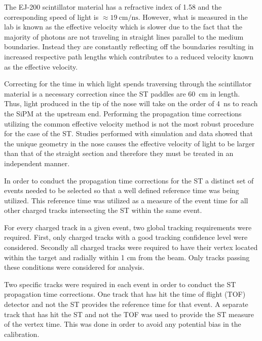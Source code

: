 The EJ-200 scintillator material has a refractive index of 1.58 \cite{ej200_specs} and the corresponding speed of light is $\approx \mathrm{19\ cm/ns}$.  However, what is measured in the lab is known as the effective velocity which is slower due to the fact that the majority of photons are not traveling in straight lines parallel to the medium boundaries.  Instead they are constantly reflecting off the boundaries resulting in increased respective path lengths which contributes to a reduced velocity known as the effective velocity.  

Correcting for the time in which light spends traversing through the scintillator material is a necessary correction since the ST paddles are 60~cm in length.  Thus, light produced in the tip of the nose will take on the order of 4~ns to reach the SiPM at the upstream end.  Performing the propagation time corrections utilizing the common effective velocity method is not the most robust procedure for the case of the ST.  Studies performed with simulation and data showed that the unique geometry in the nose causes the effective velocity of light to be larger than that of the straight section and therefore they must be treated in an independent manner.

In order to conduct the propagation time corrections for the ST a distinct set of events needed to be selected so that a well defined reference time was being utilized.  This reference time was utilized as a measure of the event time for all other charged tracks intersecting the ST within the same event.  

For every charged track in a given event, two global tracking requirements were required.  First, only charged tracks with a good tracking confidence level were considered.  Secondly all charged tracks were required to have their vertex located within the target and radially within 1 cm from the beam. Only tracks passing these conditions were considered for analysis.

Two specific tracks were required in each event in order to conduct the ST propagation time corrections.  One track that has hit the time of flight (TOF) detector and not the ST provides the reference time for that event.  A separate track that has hit the ST and not the TOF was used to provide the ST measure of the vertex time.  This was done in order to avoid any potential bias in the calibration.  
	

